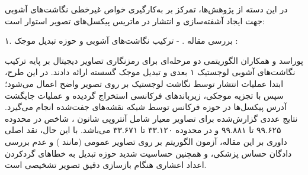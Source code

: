 







در این دسته از پژوهش‌ها، تمرکز بر به‌کارگیری خواص غیرخطی نگاشت‌های آشوبی جهت ایجاد آشفته‌سازی  و انتشار  در ماتریس پیکسل‌های تصویر استوار است:\par



۱. بررسی مقاله .  {-} ترکیب نگاشت‌های آشوبی و حوزه تبدیل موجک :\par

پوراسد و همکاران الگوریتمی دو مرحله‌ای برای رمزنگاری تصاویر دیجیتال بر پایه ترکیب نگاشت‌های آشوبی لوجستیک ۱ بعدی و تبدیل موجک گسسته  ارائه دادند. در این طرح، ابتدا عملیات انتشار توسط نگاشت لوجستیک بر روی تصویر واضح اعمال می‌شود؛ سپس با تجزیه موجکی، زیرباندهای فرکانسی  استخراج گردیده و عملیات جایگشت آدرس پیکسل‌ها در حوزه فرکانس توسط شبکه نقشه‌های جفت‌شده  انجام می‌گیرد. نتایج عددی گزارش‌شده برای تصاویر معیار شامل آنتروپی شانون ، شاخص  در محدوده ۹۹.۶۲۵ تا ۹۹.۸۸۱ و  در محدوده ۳۳.۱۲۰ تا ۳۳.۶۷۱ می‌باشد. با این حال، نقد اصلی داوری بر این مقاله، آزمون الگوریتم بر روی تصاویر عمومی (مانند ) و عدم بررسی دادگان حساس پزشکی، و همچنین حساسیت شدید حوزه تبدیل  به خطاهای گردکردن اعداد اعشاری هنگام بازسازی دقیق تصویر تشخیصی است.\par



